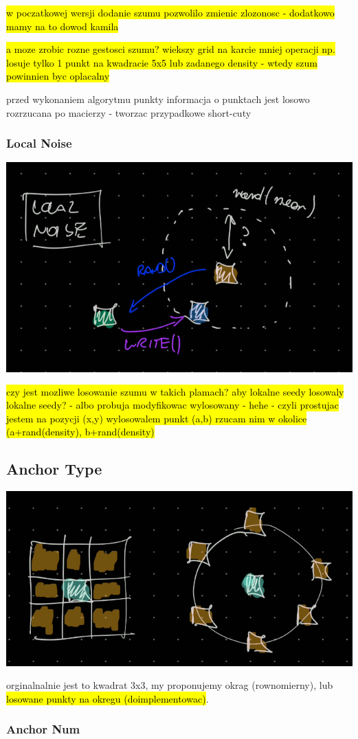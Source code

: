 \documentclass{article}
\begin{document}
\hl{w poczatkowej wersji dodanie szumu pozwolilo zmienic zlozonosc - dodatkowo
mamy na to dowod kamila}

\hl{a moze zrobic rozne gestosci szumu? wiekszy grid na karcie mniej operacji
np. losuje tylko 1 punkt na kwadracie 5x5 lub zadanego density - wtedy szum
powinnien byc oplacalny}

przed wykonaniem algorytmu punkty informacja o punktach jest losowo rozrzucana
po macierzy - tworzac przypadkowe short-cuty

\subsubsection{Local Noise} %

\includegraphics[width=0.5\linewidth]{../figures/idea_local_noise}

\hl{czy jest mozliwe losowanie szumu w takich plamach? aby lokalne seedy
losowaly lokalne seedy? - albo probuja modyfikowac wylosowany - hehe - czyli
prostujac jestem na pozycji (x,y) wylosowalem punkt (a,b) rzucam nim w okolice
(a+rand(density), b+rand(density)}

\subsection{Anchor Type} %

\includegraphics[width=0.5\linewidth]{../figures/idea_anchor_type}

orginalnalnie jest to kwadrat 3x3, my proponujemy okrag (rownomierny), lub
\hl{losowane punkty na okregu (doimplementowac)}.

\subsubsection{Anchor Num} %
\end{document}
